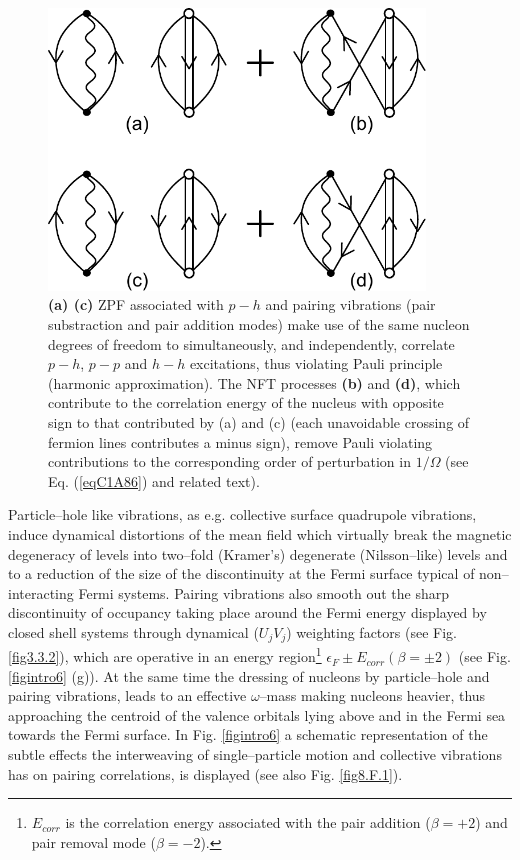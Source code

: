 \begin{figure}
\centerline {
\includegraphics*[width=10cm]{introduccion/figs/figintroF2}
}
\caption{\textbf{(a) (c)} ZPF associated with $p-h$ and pairing vibrations (pair substraction and pair addition modes) make use of the same nucleon degrees of freedom to simultaneously, and independently, correlate  $p-h$, $p-p$ and $h-h$ excitations, thus violating Pauli principle (harmonic approximation). The NFT processes \textbf{(b)} and \textbf{(d)}, which contribute to the correlation energy of the nucleus with opposite sign to that contributed by (a) and (c) (each unavoidable crossing of fermion lines contributes  a minus sign), remove Pauli violating contributions to the corresponding order of perturbation in $1/\Omega$ (see Eq. (\ref{eqC1A86}) and related text).}
\label{figintroF2}
\end{figure}
Particle--hole like vibrations, as e.g. collective surface quadrupole vibrations, induce dynamical distortions of the mean field which virtually break the  magnetic degeneracy of levels into two--fold (Kramer's) degenerate (Nilsson--like) levels and to a reduction of the size of the discontinuity at the Fermi surface typical of non--interacting Fermi systems. Pairing vibrations also smooth out the sharp discontinuity of occupancy taking place around the Fermi energy  displayed by closed shell systems through dynamical ($U_jV_j$) weighting factors (see Fig. \ref{fig3.3.2}), which are operative in an energy region\footnote{$E_{corr}$ is the correlation energy associated with the pair addition ($\beta=+2$) and pair removal mode ($\beta=-2$).}  $\epsilon_F\pm E_{corr}(\beta=\pm2)$ (see Fig. \ref{figintro6} (g)). At the same time the dressing of nucleons by particle--hole and pairing vibrations, leads to an effective $\omega$--mass making nucleons heavier, thus approaching the centroid of the valence orbitals lying above and in the Fermi sea towards the Fermi surface.  In Fig. \ref{figintro6} a schematic representation of the subtle effects the interweaving of single--particle motion and collective vibrations has on pairing correlations, is displayed (see also Fig. \ref{fig8.F.1}). 





